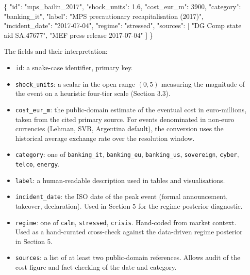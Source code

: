 \documentclass[
]{article}
\newenvironment{Shaded}{}{}
\newcommand{\DataTypeTok}[1]{\textcolor[rgb]{0.56,0.13,0.00}{#1}}
\newcommand{\DecValTok}[1]{\textcolor[rgb]{0.25,0.63,0.44}{#1}}
\newcommand{\FloatTok}[1]{\textcolor[rgb]{0.25,0.63,0.44}{#1}}
\newcommand{\FunctionTok}[1]{\textcolor[rgb]{0.02,0.16,0.49}{#1}}
\newcommand{\OtherTok}[1]{\textcolor[rgb]{0.00,0.44,0.13}{#1}}
\newcommand{\StringTok}[1]{\textcolor[rgb]{0.25,0.44,0.63}{#1}}
\providecommand{\tightlist}{%
  \setlength{\itemsep}{0pt}\setlength{\parskip}{0pt}}
\begin{document}
\begin{Shaded}
\begin{Highlighting}[]
\FunctionTok{\{}
  \DataTypeTok{"id"}\FunctionTok{:} \StringTok{"mps\_bailin\_2017"}\FunctionTok{,}
  \DataTypeTok{"shock\_units"}\FunctionTok{:} \FloatTok{1.6}\FunctionTok{,}
  \DataTypeTok{"cost\_eur\_m"}\FunctionTok{:} \DecValTok{3900}\FunctionTok{,}
  \DataTypeTok{"category"}\FunctionTok{:} \StringTok{"banking\_it"}\FunctionTok{,}
  \DataTypeTok{"label"}\FunctionTok{:} \StringTok{"MPS precautionary recapitalisation (2017)"}\FunctionTok{,}
  \DataTypeTok{"incident\_date"}\FunctionTok{:} \StringTok{"2017{-}07{-}04"}\FunctionTok{,}
  \DataTypeTok{"regime"}\FunctionTok{:} \StringTok{"stressed"}\FunctionTok{,}
  \DataTypeTok{"sources"}\FunctionTok{:} \OtherTok{[}
    \StringTok{"DG Comp state aid SA.47677"}\OtherTok{,}
    \StringTok{"MEF press release 2017{-}07{-}04"}
  \OtherTok{]}
\FunctionTok{\}}
\end{Highlighting}
\end{Shaded}

The fields and their interpretation:

\begin{itemize}
\tightlist
\item
  \texttt{id}: a snake-case identifier, primary key.
\item
  \texttt{shock\_units}: a scalar in the open range \((0, 5)\) measuring
  the magnitude of the event on a heuristic four-tier scale (Section
  3.3).
\item
  \texttt{cost\_eur\_m}: the public-domain estimate of the eventual cost
  in euro-millions, taken from the cited primary source. For events
  denominated in non-euro currencies (Lehman, SVB, Argentina default),
  the conversion uses the historical average exchange rate over the
  resolution window.
\item
  \texttt{category}: one of \texttt{banking\_it}, \texttt{banking\_eu},
  \texttt{banking\_us}, \texttt{sovereign}, \texttt{cyber},
  \texttt{telco}, \texttt{energy}.
\item
  \texttt{label}: a human-readable description used in tables and
  visualisations.
\item
  \texttt{incident\_date}: the ISO date of the peak event (formal
  announcement, takeover, declaration). Used in Section 5 for the
  regime-posterior diagnostic.
\item
  \texttt{regime}: one of \texttt{calm}, \texttt{stressed},
  \texttt{crisis}. Hand-coded from market context. Used as a
  hand-curated cross-check against the data-driven regime posterior in
  Section 5.
\item
  \texttt{sources}: a list of at least two public-domain references.
  Allows audit of the cost figure and fact-checking of the date and
  category.
\end{itemize}
\end{document}
